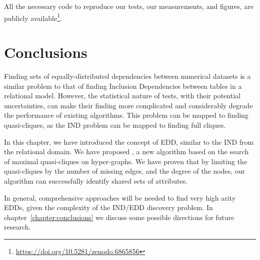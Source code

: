 All the necessary code to reproduce our tests, our
measurements, and figures, are publicly available\footnote{\url{https://doi.org/10.5281/zenodo.6865856}}.

\section{Conclusions}
\label{sec:presq_conclusions}

Finding sets of equally-distributed dependencies between numerical datasets is a similar
problem to that of finding Inclusion Dependencies between tables in a relational model.
However, the statistical nature of tests, with their potential uncertainties, can make
their finding more complicated and considerably degrade the performance of existing algorithms.
This problem can be mapped to finding quasi-cliques, as the \gls{IND} problem can be
mapped to finding full cliques.

In this chapter, we have introduced the concept of EDD, similar to the \gls{IND} from
the relational domain. We have proposed \PresQ, a new algorithm based on the search of
maximal quasi-cliques on hyper-graphs. We have proven that by limiting the quasi-cliques
by the number of missing edges, and the degree of the nodes, our algorithm can successfully
identify shared sets of attributes.

In general, comprehensive approaches will be needed to find very high arity \glspl{EDD},
given the complexity of the \gls{IND}/\gls{EDD} discovery problem.
In chapter~\ref{chapter:conclusions} we discuss some possible directions for future research.
